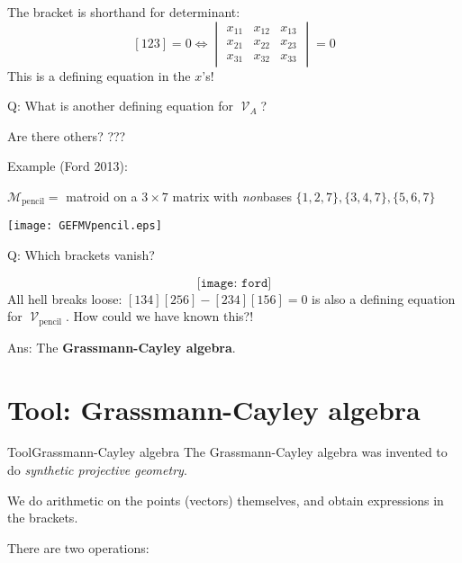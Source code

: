 \documentclass[%
	12pt]{beamer}
\theoremstyle{plain}
\theoremstyle{definition}
\DeclareMathOperator{\Var}{\mathcal V}
\begin{document}
\begin{frame}
The bracket is shorthand for determinant:
\[
[123]=0\iff 
\begin{vmatrix}
x_{11} & x_{12} & x_{13} \\
x_{21} & x_{22} & x_{23} \\
x_{31} & x_{32} & x_{33}
\end{vmatrix}
=0
\]
This is a defining equation in the $x$'s!

\pause
\vspace{1pc}
{\color{powCol}Q:} What is another defining equation for $\Var_A$?

\pause
\vspace{1pc}
Are there others? \pause ???
\end{frame}

\begin{frame}{}{}
{\color{powCol}Example (Ford 2013):} 

\vspace{0.5pc}
$\mathscr M_{\text{pencil}}=$ matroid on a $3\times 7$ matrix with \emph{non}bases $\{1,2,7\},\{3,4,7\},\{5,6,7\}$  

\vspace{-1pc}
\begin{center}
\texttt{[image: GEFMVpencil.eps]}
\end{center}
{\color{powCol}Q:} Which brackets vanish?
\end{frame}

\begin{frame}{}{}
\[
\texttt{[image: ford]}
\]
{\color{powCol}All hell breaks loose:} $[134][256]-[234][156]=0$ is also a defining equation for $\Var_{\text{pencil}}$.  \pause How could we have known this?!

\pause
\vspace{1pc}
{\color{powCol}Ans:} The \textbf{Grassmann-Cayley algebra}.  %
\end{frame}

\section{Tool: Grassmann-Cayley algebra}

\begin{frame}{Tool}{Grassmann-Cayley algebra}
The Grassmann-Cayley algebra was invented to do \emph{synthetic projective geometry}.

\vspace{1pc}
We do arithmetic on the points (vectors) themselves, and obtain expressions in the brackets.

\pause
\vspace{1pc}
There are two operations:
\end{frame}
\end{document}
